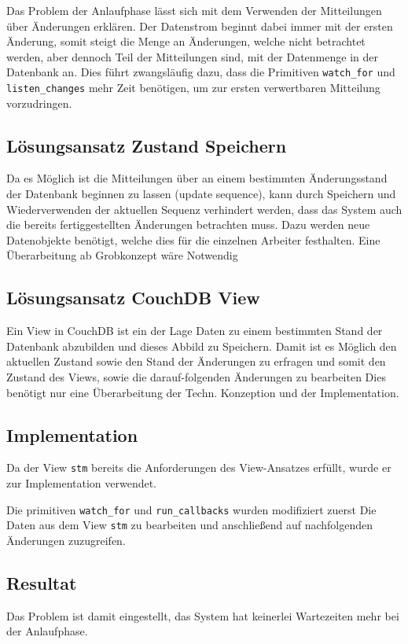 Das Problem der Anlaufphase lässt sich mit dem Verwenden der Mitteilungen über Änderungen erklären. Der Datenstrom beginnt dabei immer mit der ersten Änderung,
somit steigt die Menge an Änderungen, welche nicht betrachtet werden, aber dennoch Teil der Mitteilungen sind, mit der Datenmenge in der Datenbank an.
Dies führt zwangsläufig dazu, dass die Primitiven \verb|watch_for| und \verb|listen_changes| mehr Zeit benötigen, um zur ersten verwertbaren Mitteilung vorzudringen.


\subsection{Lösungsansatz Zustand Speichern}

Da es Möglich ist die Mitteilungen über an einem bestimmten Änderungsstand der 
Datenbank beginnen zu lassen (update sequence),
kann durch Speichern und Wiederverwenden der aktuellen Sequenz verhindert werden,
dass das System auch die bereits fertiggestellten Änderungen betrachten muss.
Dazu werden neue Datenobjekte benötigt, welche dies für die einzelnen Arbeiter festhalten. Eine Überarbeitung ab Grobkonzept wäre Notwendig


\subsection{Lösungsansatz CouchDB View}

Ein View in CouchDB ist ein der Lage Daten zu einem bestimmten Stand der Datenbank abzubilden und dieses Abbild zu Speichern.
Damit ist es Möglich den aktuellen Zustand sowie den Stand der Änderungen zu erfragen und somit den Zustand des Views, sowie die darauf-folgenden Änderungen zu bearbeiten 
Dies benötigt nur eine Überarbeitung der Techn. Konzeption und der Implementation.

\subsection{Implementation}
Da der View \verb|stm| bereits die Anforderungen des View-Ansatzes erfüllt,
wurde er zur Implementation verwendet.

Die primitiven \verb|watch_for| und \verb|run_callbacks| wurden modifiziert zuerst
Die Daten aus dem View \verb|stm| zu bearbeiten und anschließend 
auf nachfolgenden Änderungen zuzugreifen.

\subsection{Resultat}
Das Problem ist damit eingestellt, das System hat keinerlei Wartezeiten mehr bei der Anlaufphase.


